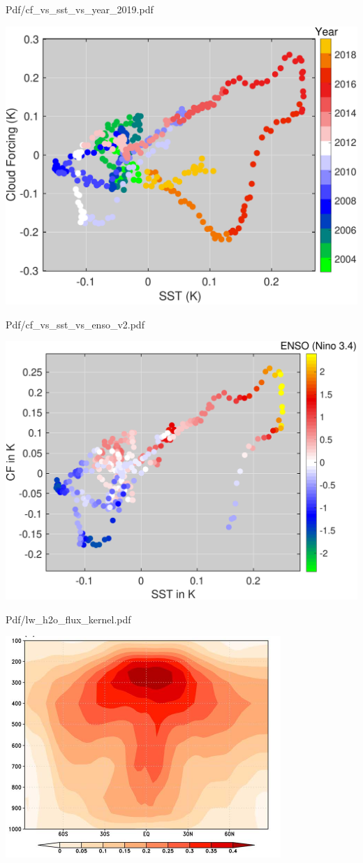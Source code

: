 \documentclass[10pt,t]{beamer}
\begin{document}
\begin{frame}[label={sec:org1afc9a7}]{Pdf/cf\_vs\_sst\_vs\_year\_2019.pdf}
\begin{center}
\includegraphics[width=0.7\linewidth]{./Figs/Pdf/cf_vs_sst_vs_year_2019.pdf}
\end{center}
\end{frame}

\begin{frame}[label={sec:orgce5a911}]{Pdf/cf\_vs\_sst\_vs\_enso\_v2.pdf}
\begin{center}
\includegraphics[width=0.7\linewidth]{./Figs/Pdf/cf_vs_sst_vs_enso_v2.pdf}
\end{center}
\end{frame}

\begin{frame}[label={sec:org34bfedd}]{Pdf/lw\_h2o\_flux\_kernel.pdf}
\begin{center}
\includegraphics[width=0.7\linewidth]{./Figs/Pdf/lw_h2o_flux_kernel.pdf}
\end{center}
\end{frame}
\end{document}
